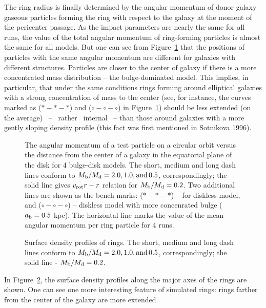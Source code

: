 The ring radius is finally determined by the angular momentum of 
donor galaxy gaseous particles forming the ring with respect to the 
galaxy at the moment of the pericenter passage. As the impact parameters 
are nearly the same for all runs, the value of the total angular momentum 
of ring-forming particles is almost the same for all models. But 
one can see from Figure~\ref{Fmom} that the positions of particles with 
the same angular momentum are different for galaxies with different 
structures. Particles 
are closer to the center of galaxy if there is a more 
concentrated mass distribution -- the bulge-dominated model. This implies, 
in particular, that under the same conditions rings forming around 
elliptical galaxies with a strong concentration of mass to the center 
(see, for instance, the curves marked as ($*-*-*$) and 
($\circ-\circ-\circ$) in 
Figure~\ref{Fmom}) should be less extended (on the 
average)~ --~ rather~ internal~ -- 
than those around galaxies with a more gently sloping 
density profile (this fact was first mentioned in Sotnikova 1996).
 
\begin{figure}
\picplace{0.8cm}
\caption{The angular momentum of a test particle on a circular orbit 
versus the distance from the center of a galaxy in the 
equatorial plane of the disk for 4 bulge-disk models. 
The short, medium and long dash lines conform to 
$M_{\rm b}/M_{\rm d}=2.0, 1.0, {\rm and\,} 0.5$, correspondingly; the 
solid line gives $v_{\rm rot}r-r$ relation for 
$M_{\rm b}/M_{\rm d}=0.2$. Two additional lines are shown as the 
bench-marks: ($*-*-*$) -- for diskless model, and 
($\circ-\circ-\circ$) -- diskless model with more concenrated bulge 
($a_{\rm b}=0.5$ kpc). The horizontal line marks the value of the mean 
angular momentum per ring particle for 4 runs.} 
\label{Fmom}
\end{figure}

\begin{figure}
\picplace{0.8cm}
\caption{Surface density profiles of rings. 
The short, medium and long dash lines conform to 
$M_{\rm b}/M_{\rm d}=2.0, 1.0, {\rm and\,} 0.5$, correspondingly; the 
solid line - $M_{\rm b}/M_{\rm d}=0.2$.} 
\label{F12}
\end{figure}

In Figure~\ref{F12}, the surface density profiles along 
the major axes of the rings are shown. 
One can see one more interesting feature of simulated rings: rings 
farther from the center of the galaxy are more extended. 

